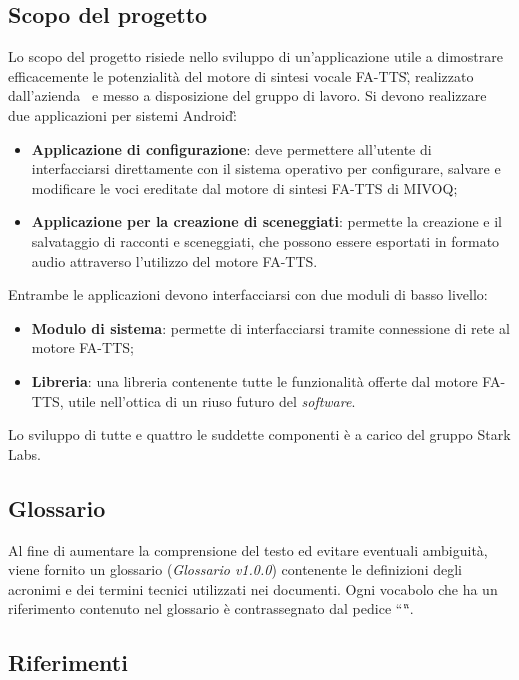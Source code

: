 \subsection{Scopo del progetto}
Lo scopo del progetto risiede nello sviluppo di un'applicazione utile a dimostrare efficacemente
le potenzialità del motore di sintesi vocale FA-TTS\G, realizzato dall'azienda \AZIENDA\ e messo a disposizione del gruppo di lavoro. Si devono realizzare due applicazioni per sistemi Android\G:
\begin{itemize}
	\item \textbf{Applicazione di configurazione}: deve permettere all'utente di interfacciarsi direttamente con il sistema operativo per configurare, salvare e modificare le voci ereditate dal motore di sintesi FA-TTS di MIVOQ;
	\item \textbf{Applicazione per la creazione di sceneggiati}: permette la creazione e il salvataggio di racconti e sceneggiati, che possono essere esportati in formato audio attraverso l'utilizzo del motore FA-TTS.
\end{itemize}
Entrambe le applicazioni devono interfacciarsi con due moduli di basso livello:
\begin{itemize}
	\item \textbf{Modulo di sistema}: permette di interfacciarsi tramite connessione di rete al motore FA-TTS;
	\item \textbf{Libreria}: una libreria contenente tutte le funzionalità offerte dal motore FA-TTS, utile nell'ottica di un riuso futuro del \textit{software}.
\end{itemize} 
Lo sviluppo di tutte e quattro le suddette componenti è a carico del gruppo Stark Labs.

\subsection{Glossario}
Al fine di aumentare la comprensione del testo ed evitare eventuali ambiguità, viene fornito un glossario (\textit{Glossario v1.0.0}) contenente le definizioni degli acronimi e dei termini tecnici utilizzati nei documenti. Ogni vocabolo che ha un riferimento contenuto nel glossario è contrassegnato dal pedice “\G “.

\subsection{Riferimenti}

